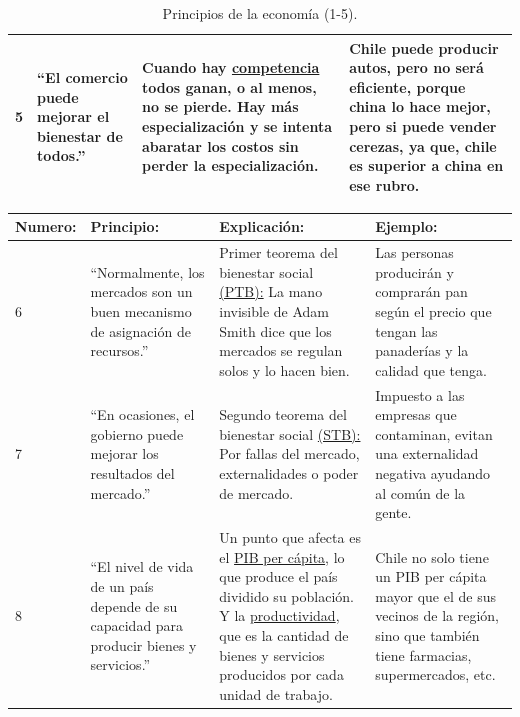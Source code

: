 \documentclass[
  letterpaper,
  DIV=11,
  numbers=noendperiod]{scrreport}
\begin{document}
\begin{table}[H]
{\begin{tabular}{|p{20mm}|p{30mm}|p{37mm}|p{53mm}|}
        5 & \hspace{2mm} “El comercio puede mejorar el bienestar de todos.” & \hspace{2mm} Cuando hay \underline{competencia} todos ganan, o al menos, no se pierde. Hay más especialización y se intenta abaratar los costos sin perder la especialización. & \hspace{2mm} Chile puede producir autos, pero no será eficiente, porque china lo hace mejor, pero si puede vender cerezas, ya que, chile es superior a china en ese rubro. \\ \hline
        \end{tabular}}
    \caption{Principios de la economía (1-5).}
    \label{tabla:final}
\end{table}

\begin{table}[H]
    \centering
    \begin{tabular}{|p{16mm}|p{30mm}|p{59mm}|p{40mm}|}
        \hline
        Numero: & Principio: & Explicación: & Ejemplo: \\ \hline
        6 & \hspace{2mm} “Normalmente, los mercados son un buen mecanismo de asignación de recursos.” & \hspace{2mm} Primer teorema del bienestar social \underline{(PTB):} La mano invisible de Adam Smith dice que los mercados se regulan solos y lo hacen bien. {\color{red}{Este principio concluye que es el egoísmo individual, con relación a la economía, el que trae mayores beneficios a la sociedad y no la solidaridad de los individuos.}}    & \hspace{2mm} Las personas producirán y comprarán pan según el precio que tengan las panaderías y la calidad que tenga. \\ \hline
        7 & \hspace{2mm} “En ocasiones, el gobierno puede mejorar los resultados del mercado.” & \hspace{2mm} Segundo teorema del bienestar social \underline{(STB):} Por fallas del mercado, externalidades o poder de mercado. & \hspace{2mm} Impuesto a las empresas que contaminan, evitan una externalidad negativa ayudando al común de la gente. \\ \hline
        8 & \hspace{2mm} “El nivel de vida de un país depende de su capacidad para producir bienes y servicios.” & \hspace{2mm} Un punto que afecta es el \underline{PIB per cápita}, lo que produce el país dividido su población. Y la \underline{productividad}, que es la cantidad de bienes y servicios producidos por cada unidad de trabajo. & \hspace{2mm} Chile no solo tiene un PIB per cápita mayor que el de sus vecinos de la región, sino que también tiene farmacias, supermercados, etc. \\ \hline

\end{tabular}
\end{table}
\end{document}
